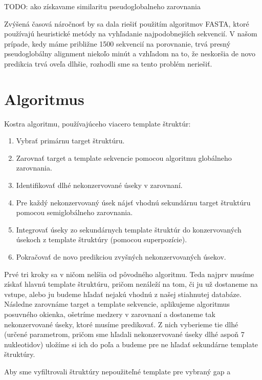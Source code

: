 \indent TODO: ako získavame similaritu pseudoglobalneho zarovnania


\indent Zvýšená časová náročnosť by sa dala riešiť použitím algoritmov FASTA, ktoré používajú heuristické metódy na vyhľadanie najpodobnejších sekvencií. V našom prípade, kedy máme približne 1500 sekvencií na porovnanie, trvá presný pseudoglobálny alignment niekoľo minút a vzhľadom na to, že neskoršia de novo predikcia trvá oveľa dlhšie, rozhodli sme sa tento problém neriešiť.


\section{Algoritmus}
\indent Kostra algoritmu, používajúceho viacero template štruktúr:
\begin{enumerate}
\item Vybrať primárnu target štruktúru.
\item Zarovnať  target a template sekvencie pomocou algoritmu globálneho zarovnania.
\item Identifikovať dlhé nekonzervované úseky v zarovnaní.
\item Pre každý nekonzervovaný úsek nájsť vhodnú sekundárnu target štruktúru pomocou semiglobálneho zarovnania.
\item Integrovať úseky zo sekundárnych template štruktúr do konzervovaných úsekoch z template štruktúry (pomocou superpozície).
\item Pokračovať de novo predikciou zvyšných nekonzervovaných úsekov.
\end{enumerate}


\indent Prvé tri kroky sa v ničom nelíšia od pôvodného algoritmu. Teda najprv musíme získať hlavnú template štruktúru, pričom nezáleží na tom, či ju už dostaneme na vstupe, alebo ju budeme hľadať nejakú vhodnú z našej stiahnutej databáze. Následne zarovnáme target a template sekvencie, aplikujeme algoritmus posuvného okienka, ošetríme medzery v zarovnaní a dostaneme tak nekonzervované úseky, ktoré musíme predikovať. Z nich vyberieme tie dlhé (určené parametrom, pričom sme hľadali nekonzervované úseky dlhé aspoň 7 nukleotidov) uložíme si ich do poľa a budeme pre ne hľadať sekundárne template štruktúry.


\indent Aby sme vyfiltrovali štruktúry nepoužiteľné template pre vybraný gap a  


